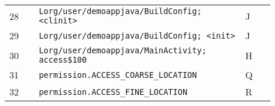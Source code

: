\begin{table}[h]
\begin{tabular}{@{}p{0.1\linewidth}p{0.7\linewidth}p{0.1\linewidth}@{}}
28                               & \texttt{Lorg/user/demoappjava/BuildConfig; <clinit>}               & J           \\
29                               & \texttt{Lorg/user/demoappjava/BuildConfig; <init>}                 & J           \\
30                               & \texttt{Lorg/user/demoappjava/MainActivity; access\$100}            & H           \\
31                               & \texttt{permission.ACCESS\_COARSE\_LOCATION}                         & Q           \\
32                               & \texttt{permission.ACCESS\_FINE\_LOCATION}                           & R           \\ \bottomrule
\end{tabular}
\end{table}
